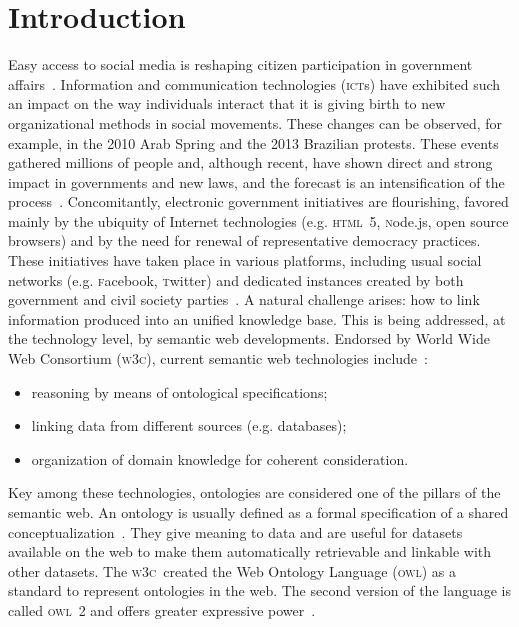 \documentclass[10pt,letterpaper]{article}
\newcommand{\owl}{\textsc{owl}}
\newcommand{\ict}{\textsc{ict}}
\newcommand{\html}{\textsc{html}}
\newcommand{\node}{\textsc{n}ode.js}
\newcommand{\facebook}{\textsc{f}acebook}
\newcommand{\twitter}{\textsc{t}witter}
\newcommand{\wwwc}{\textsc{w3c}}
\begin{document}
\section{Introduction}\label{sec:into}
Easy access to social media is reshaping citizen participation in government affairs~\cite{socMed}. 
Information and communication technologies (\ict s) have exhibited such an impact on the way individuals interact
that it is giving birth to new organizational methods in social movements.
These changes can be observed, for example, in the 2010 Arab Spring and the 2013 Brazilian protests.
These events gathered millions of people and, although recent,
have shown direct and strong impact in governments and new laws,
and the forecast is an intensification of the process~\cite{digRev1,digRev2,digRev3}.
Concomitantly, electronic government initiatives are flourishing,
favored mainly by the ubiquity of Internet technologies (e.g. \html\ 5, \node, open source browsers)
and by the need for renewal of representative democracy practices. 
These initiatives have taken place in various platforms, including usual social networks (e.g. \facebook, \twitter)
and dedicated instances created by both government and civil society parties~\cite{socMed,pita2010arquitetura,barros2010alem,knowledge}.
A natural challenge arises: how to link information produced into an unified knowledge base.
This is being addressed, at the technology level, by semantic web developments.
Endorsed by World Wide Web Consortium (\wwwc), current semantic web technologies include~\cite{Sem1}:
\begin{itemize}
    \item reasoning by means of ontological specifications;
    \item linking data from different sources (e.g. databases);
    \item organization of domain knowledge for coherent consideration.
\end{itemize}
\noindent Key among these technologies, ontologies are considered one of the pillars of the semantic web.
An ontology is usually defined as a formal specification of a shared conceptualization~\cite{gruber}.
They give meaning to data and are useful for datasets available on the web 
to make them automatically retrievable and linkable with other datasets.
The \wwwc\ created the Web Ontology Language (\owl) as a standard to represent ontologies in the web.
The second version of the language is called \owl\ 2 and offers greater expressive power~\cite{owl2}.
\end{document}
